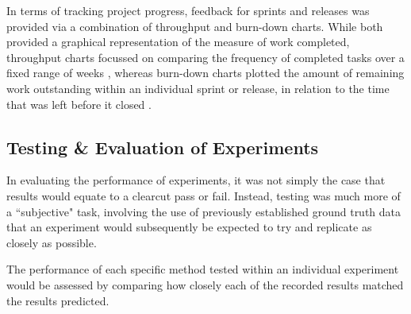 In terms of tracking project progress, feedback for sprints and releases was provided via a combination of throughput and burn-down charts. While both provided a graphical representation of the measure of work completed, throughput charts focussed on comparing the frequency of completed tasks over a fixed range of weeks \cite{}, whereas burn-down charts plotted the amount of remaining work outstanding within an individual sprint or release, in relation to the time that was left before it closed \cite{}.

\subsection{Testing \& Evaluation of Experiments}

In evaluating the performance of experiments, it was not simply the case that results would equate to a clearcut pass or fail. Instead, testing was much more of a ``subjective" task, involving the use of previously established ground truth data that an experiment would subsequently be expected to try and replicate as closely as possible. 

The performance of each specific method tested within an individual experiment would be assessed by comparing how closely each of the recorded results matched the results predicted. 





